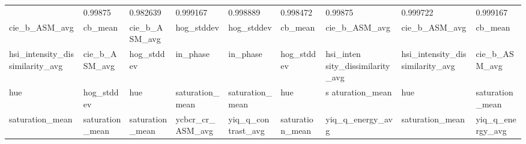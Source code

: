 \documentclass[letterpaper]{article}
\begin{document}
{\begin{tiny}
\begin{longtable}{lllllllll}
\bottomrule
\endlastfoot
0.986736 &         0.99875 &        0.982639 &         0.999167 &           0.998889 &        0.998472 &
    0.99875 &                        0.999722 &         0.999167 \\
cie\_b\_ASM\_avg &         cb\_mean &   cie\_b\_ASM\_avg &       hog\_stddev &         hog\_stddev &         cb\_mean &
        cie\_b\_ASM\_avg &                   cie\_b\_ASM\_avg &          cb\_mean \\
hsi\_intensity\_dissimilarity\_avg &   cie\_b\_ASM\_avg &      hog\_stddev &         in\_phase &           in\_phase &      hog\_stddev & hsi\_inten
sity\_dissimilarity\_avg & hsi\_intensity\_dissimilarity\_avg &    cie\_b\_ASM\_avg \\
hue &      hog\_stddev &             hue &  saturation\_mean &    saturation\_mean &             hue &                 s
aturation\_mean &                             hue &  saturation\_mean \\
saturation\_mean & saturation\_mean & saturation\_mean & ycbcr\_cr\_ASM\_avg & yiq\_q\_contrast\_avg & saturation\_mean &
     yiq\_q\_energy\_avg &                 saturation\_mean & yiq\_q\_energy\_avg \\
\end{longtable}


\end{tiny}



}
\end{document}
